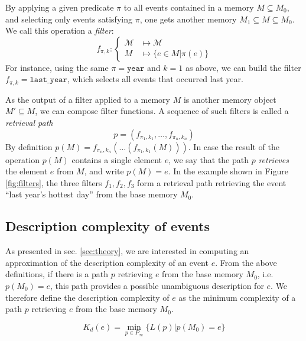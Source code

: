 \documentclass[conference]{IEEEtran}
\begin{document}
By applying a given predicate $\pi$ to all events contained in a memory $M \subseteq M_0$, and selecting only events satisfying $\pi$, one gets another memory $M_1 \subseteq M \subseteq M_0$. We call this operation a \emph{filter}:
\begin{equation}
  \label{eq:filter}
f_{\pi, k}: \begin{cases}
\mathcal{M} & \mapsto \mathcal{M}             \\
M           & \mapsto \{e \in M | \pi(e) \}
\end{cases}
\end{equation}
For instance, using the same $\pi = \mathtt{year}$ and $k=1$ as above, we can
build the filter $f_{\pi, k} = \mathtt{last\_{}year}$, which selects all events
that occurred last year.

As the output of a filter applied to a memory $M$ is another memory
object $M' \subseteq M$, we can compose filter
functions. A sequence of such filters is called a \emph{retrieval path}
\begin{equation}
\label{eq:ret_def}
p = (f_{\pi_{1}, k_{1}}, \dots, f_{\pi_{n}, k_{n}})
\end{equation}
By definition
$p(M) = f_{\pi_{n}, k_{n}}(\dots(f_{\pi_{1}, k_{1}}(M)))$.
In case the result of the operation $p(M)$ contains a single element
$e$, we say that the path $p$ \emph{retrieves} the element $e$ from $M$, and write
$p(M) = e$. In the example shown in Figure \ref{fig:filters}, the three filters $f_1, f_2, f_3$ form a retrieval path retrieving the event ``last year's hottest day'' from the base memory $M_0$.

\subsection{Description complexity of events}

As presented in sec. \ref{sec:theory}, we are interested in computing an approximation of the description complexity of an event $e$. From the above definitions, if there is a path $p$ retrieving $e$ from the base memory $M_0$, i.e. $p(M_0) = e$, this path provides a possible unambiguous description for $e$. We therefore define the description complexity of $e$ as the minimum complexity of a path $p$ retrieving $e$ from the base memory $M_0$.

\begin{equation}
  \label{eq:k_desc}
  K_d(e) = \min_{p \in P_\infty} \{L(p) | p(M_0) = e\}
\end{equation}
\end{document}
